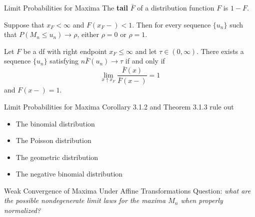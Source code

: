 \documentclass{beamer}
\begin{document}
\begin{frame}{Limit Probabilities for Maxima}
    The \textbf{tail} $\bar{F}$ of a distribution function $F$ is $1 - F$.
    \begin{corollary}[3.1.2]
        Suppose that $x_F < \infty$ and $F(x_F-) < 1$. Then for every sequence $\{u_n\}$ such that $P(M_n \le u_n) \to \rho$, either $\rho = 0$ or $\rho = 1$.
    \end{corollary}
    \begin{theorem}[3.1.3]
        Let $F$ be a df with right endpoint $x_F \le \infty$ and let $\tau \in (0, \infty)$. There exists a sequence $\{u_n\}$ satisfying $n\bar{F}(u_n) \to \tau$ if and only if
        \[
        \lim_{x \uparrow x_F} \frac{\bar{F}(x)}{\bar{F}(x-)} = 1
        \]
        and $F(x-) = 1$.
    \end{theorem}
\end{frame}

\begin{frame}{Limit Probabilities for Maxima}
    Corollary 3.1.2 and Theorem 3.1.3 rule out
    \begin{itemize}
        \item The binomial distribution
        \item The Poisson distribution
        \item The geometric distribution
        \item The negative binomial distribution
    \end{itemize}
\end{frame}

\begin{frame}{Weak Convergence of Maxima Under Affine Transformations}
    Question: \textit{what are the possible nondegenerate limit laws for the maxima $M_n$ when properly normalized?}
\end{frame}
\end{document}

